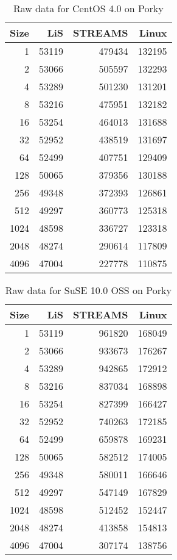 \documentclass[letterpaper,final,notitlepage,twocolumn,10pt,twoside]{article}
\begin{document}
\begin{appendix}
\begin{table}[hp]
\footnotesize
\center\begin{tabular}{rrrr}\\
\hline
Size & LiS & STREAMS & Linux\\
\hline
\hline
1 & 53119 & 479434 & 132195\\
2 & 53066 & 505597 & 132293\\
4 & 53289 & 501230 & 131201\\
8 & 53216 & 475951 & 132182\\
16 & 53254 & 464013 & 131688\\
32 & 52952 & 438519 & 131697\\
64 & 52499 & 407751 & 129409\\
128 & 50065 & 379356 & 130188\\
256 & 49348 & 372393 & 126861\\
512 & 49297 & 360773 & 125318\\
1024 & 48598 & 336727 & 123318\\
2048 & 48274 & 290614 & 117809\\
4096 & 47004 & 227778 & 110875\\
\hline
\end{tabular}
\caption{Raw data for CentOS 4.0 on Porky}
\label{table:centosdata}
\normalsize
\end{table}

\begin{table}[hp]
\footnotesize
\center\begin{tabular}{rrrr}\\
\hline
Size & LiS & STREAMS & Linux\\
\hline
\hline
1 & 53119 & 961820 & 168049\\
2 & 53066 & 933673 & 176267\\
4 & 53289 & 942865 & 172912\\
8 & 53216 & 837034 & 168898\\
16 & 53254 & 827399 & 166427\\
32 & 52952 & 740263 & 172185\\
64 & 52499 & 659878 & 169231\\
128 & 50065 & 582512 & 174005\\
256 & 49348 & 580011 & 166646\\
512 & 49297 & 547149 & 167829\\
1024 & 48598 & 512452 & 152447\\
2048 & 48274 & 413858 & 154813\\
4096 & 47004 & 307174 & 138756\\
\hline
\end{tabular}
\caption{Raw data for SuSE 10.0 OSS on Porky}
\label{table:susedata}
\normalsize
\end{table}


\end{appendix}
\end{document}
